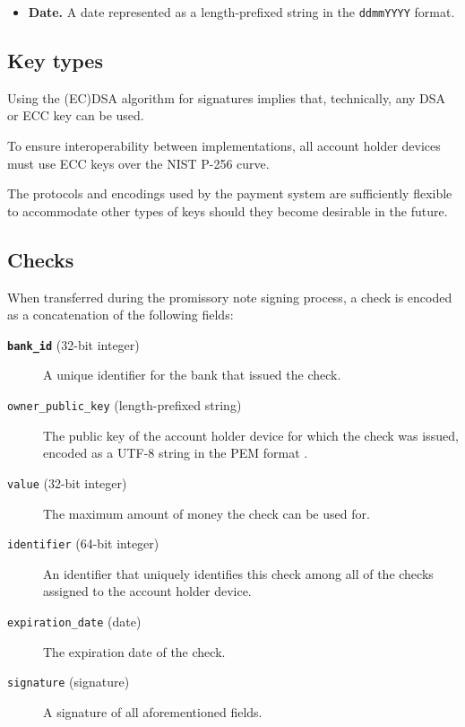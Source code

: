 \documentclass[12pt,a4paper]{article}
\begin{document}
\begin{multicols}{2}
\begin{itemize}
		\item \textbf{Date.} A date represented as a length-prefixed string in the \texttt{ddmmYYYY} format.
		
	\end{itemize}

	\subsection{Key types}
	\label{sec:key-types}

	Using the (EC)DSA algorithm for signatures implies that, technically, any DSA or ECC key can be used.
	
	To ensure interoperability between implementations, all account holder devices must use ECC keys over the NIST P-256 curve.

	The protocols and encodings used by the payment system are sufficiently flexible to accommodate other types of keys should they become desirable in the future.

	\subsection{Checks}
	
	When transferred during the promissory note signing process, a check is encoded as a concatenation of the following fields:
	
	\begin{description}
		\item[\textbf{\texttt{bank\_id}} (32-bit integer)] A unique identifier for the bank that issued the check.

		\item[\texttt{owner\_public\_key} (length-prefixed string)] The public key of the account holder device for which the check was issued, encoded as a UTF-8 string in the PEM format \cite{rfc-pem}.

		\item[\texttt{value} (32-bit  integer)] The maximum amount of money the check can be used for.

		\item[\texttt{identifier} (64-bit integer)] An identifier that uniquely identifies this check among all of the checks assigned to the account holder device.
		
		\item[\texttt{expiration\_date} (date)] The expiration date of the check.

		\item[\texttt{signature} (signature)] A signature of all aforementioned fields.
	\end{description}


\end{multicols}
\end{document}
